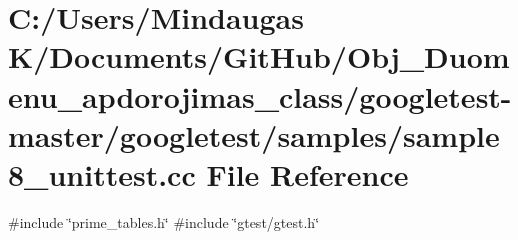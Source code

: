\hypertarget{googletest-master_2googletest_2samples_2sample8__unittest_8cc}{}\section{C\+:/\+Users/\+Mindaugas K/\+Documents/\+Git\+Hub/\+Obj\+\_\+\+Duomenu\+\_\+apdorojimas\+\_\+class/googletest-\/master/googletest/samples/sample8\+\_\+unittest.cc File Reference}
\label{googletest-master_2googletest_2samples_2sample8__unittest_8cc}
{\ttfamily \#include \char`\"{}prime\+\_\+tables.\+h\char`\"{}}\newline
{\ttfamily \#include \char`\"{}gtest/gtest.\+h\char`\"{}}\newline
